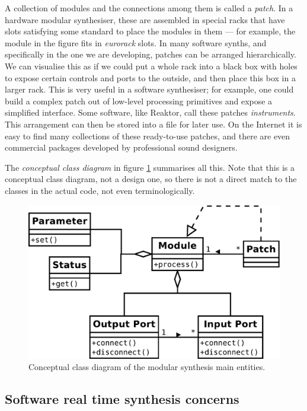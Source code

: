 A collection of modules and the connections among them is called a
\emph{patch}. In a hardware modular synthesiser, these
are assembled in special racks that have slots satisfying some
standard to place the modules in them --- for example, the module in
the figure fits in \emph{eurorack} slots. In many software synths, and
specifically in the one we are developing, patches can be arranged
hierarchically. We can visualise this as if we could put a whole rack
into a black box with holes to expose certain controls and ports to
the outside, and then place this box in a larger rack. This is very
useful in a software synthesiser; for example, one could build a
complex patch out of low-level processing primitives and expose a
simplified interface. Some software, like Reaktor, call these patches
\emph{instruments}. This arrangement can then be
stored into a file for later use. On the Internet it is easy to find
many collections of these ready-to-use patches, and there are even
commercial packages developed by professional sound designers.

The \emph{conceptual class diagram} in figure \ref{fig:graphconcept}
summarises all this. Note that this is a conceptual class diagram, not
a design one, so there is not a direct match to the
classes in the actual code, not even terminologically.

\begin{figure}[h]
  \centering
  \includegraphics[width=.8\textwidth]{pic/graph-concept.pdf}
  \caption{Conceptual class diagram of the modular synthesis main
    entities.}
  \label{fig:graphconcept}
\end{figure}

\subsection{Software real time synthesis concerns}
\label{sec:rtsynth}

